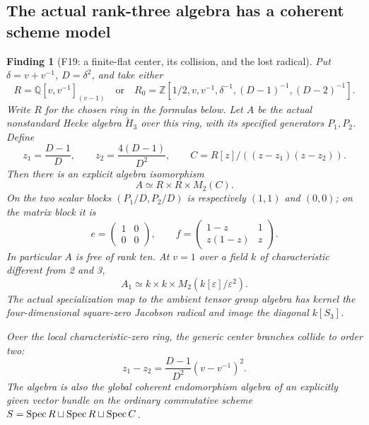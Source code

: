 \documentclass[11pt,a4paper]{article}
\newcommand{\Q}{\mathbb Q}\newcommand{\Z}{\mathbb Z}\newcommand{\C}{\mathbb C}\newcommand{\N}{\mathbb N}\newcommand{\F}{\mathbb F}
\newcommand{\fid}[1]{\textsf{#1}}\newcommand{\gate}[1]{\textsf{#1}}
\theoremstyle{named}\newtheorem{finding}{Finding}[section]
\theoremstyle{definition}\newtheorem{definition}[finding]{Definition}
\theoremstyle{remark}\newtheorem{remark}[finding]{Remark}
\begin{document}
\subsection{The actual rank-three algebra has a coherent scheme model}
\begin{finding}[\fid{F19}: a finite-flat center, its collision, and the lost radical]\label{f:rankthree}
Put $\delta=v+v^{-1}$, $D=\delta^2$, and take either
\[
 R=\Q[v,v^{-1}]_{(v-1)}
 \quad\text{or}\quad
 R_0=\Z[1/2,v,v^{-1},\delta^{-1},(D-1)^{-1},(D-2)^{-1}].
\]
Write $R$ for the chosen ring in the formulas below. Let $A$ be the actual nonstandard Hecke algebra $\check H_3$ over this ring, with its specified generators $P_1,P_2$. Define
\[
 z_1=\frac{D-1}{D},\qquad z_2=\frac{4(D-1)}{D^2},\qquad
 C=R[z]/((z-z_1)(z-z_2)).
\]
Then there is an explicit algebra isomorphism
\begin{equation}\label{eq:r3model}
 A\simeq R\times R\times M_2(C).
\end{equation}
On the two scalar blocks $(P_1/D,P_2/D)$ is respectively $(1,1)$ and $(0,0)$; on the matrix block it is
\[
 e=\begin{pmatrix}1&0\\0&0\end{pmatrix},\qquad
 f=\begin{pmatrix}1-z&1\\z(1-z)&z\end{pmatrix}.
\]
In particular $A$ is free of rank ten. At $v=1$ over a field $k$ of characteristic different from 2 and 3,
\[
 A_1\simeq k\times k\times M_2(k[\varepsilon]/\varepsilon^2).
\]
The actual specialization map to the ambient tensor group algebra has kernel the four-dimensional square-zero Jacobson radical and image the diagonal $k[S_3]$.

Over the local characteristic-zero ring, the generic center branches collide to order two:
\begin{equation}\label{eq:r3collision}
 z_1-z_2=\frac{D-1}{D^2}(v-v^{-1})^2.
\end{equation}
The algebra is also the global coherent endomorphism algebra of an explicitly given vector bundle on the ordinary commutative scheme
$S=\operatorname{Spec} R\sqcup\operatorname{Spec} R\sqcup\operatorname{Spec} C$.
\end{finding}
\end{document}
